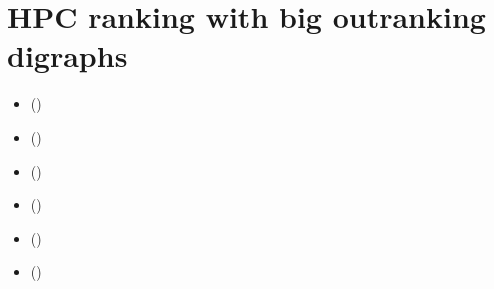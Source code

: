 \documentclass[a4paper,12pt,english]{sphinxhowto}
\begin{document}
\section{HPC ranking with big outranking digraphs}
\label{\detokenize{tutorial:hpc-ranking-with-big-outranking-digraphs}}\label{\detokenize{tutorial:hpc-tutorial-label}}
\begin{sphinxShadowBox}
\begin{itemize}
\item {} 
\label{\detokenize{tutorial:id294}}{\hyperref[\detokenize{tutorial:c-compiled-python-modules}]{}} ()

\item {} 
\label{\detokenize{tutorial:id295}}{\hyperref[\detokenize{tutorial:big-data-performance-tableaux}]{}} ()

\item {} 
\label{\detokenize{tutorial:id296}}{\hyperref[\detokenize{tutorial:c-implemented-integer-valued-outranking-digraphs}]{}} ()

\item {} 
\label{\detokenize{tutorial:id297}}{\hyperref[\detokenize{tutorial:the-sparse-outranking-digraph-implementation}]{}} ()

\item {} 
\label{\detokenize{tutorial:id298}}{\hyperref[\detokenize{tutorial:ranking-big-sets-of-decision-alternatives}]{}} ()

\item {} 
\label{\detokenize{tutorial:id299}}{\hyperref[\detokenize{tutorial:hpc-quantiles-ranking-records}]{}} ()

\end{itemize}
\end{sphinxShadowBox}
\end{document}
